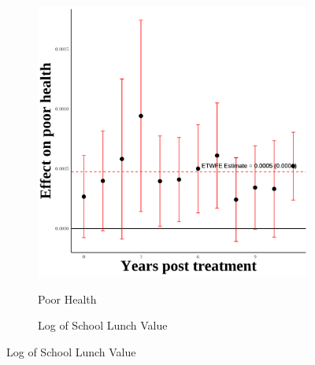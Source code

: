 \documentclass[12pt,english]{article}
\begin{document}
\begin{figure}[H]
\begin{subfigure}[b]{0.30\textwidth}
    \label{fig:third-gen-four}
  \end{subfigure}
  \hfill %
  \begin{subfigure}[b]{0.30\textwidth}
    \centering
    \label{fig:empty} %
  \end{subfigure}

\end{figure}

\pagebreak

\begin{figure}[H]
  \caption{Effect of Immigration Enforcement on Children's Outcomes: All Generations}
  \centering

  \begin{subfigure}[b]{0.3\textwidth}
    \centering
    \caption{Poor Health}
    \includegraphics[width=\linewidth]{figures/plot01-poor_health_event_study.png}
    \label{fig:poor-health}
  \end{subfigure}
  \hfill
  \begin{subfigure}[b]{0.3\textwidth}
    \centering
    \caption{Log of School Lunch Value}

\end{subfigure}
\end{figure}
\end{document}
